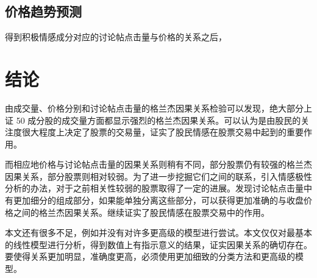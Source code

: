 \section{价格趋势预测}

得到积极情感成分对应的讨论帖点击量与价格的关系之后，

\chapter{结论}

由成交量、价格分别和讨论帖点击量的格兰杰因果关系检验可以发现，绝大部分上证 50 成分股的成交量方面都显示强烈的格兰杰因果关系。可以认为是由股民的关注度很大程度上决定了股票的交易量，证实了股民情感在股票交易中起到的重要作用。

而相应地价格与讨论帖点击量的因果关系则稍有不同，部分股票仍有较强的格兰杰因果关系，部分股票则相对较弱。为了进一步挖掘它们之间的联系，引入情感极性分析的办法，对于之前相关性较弱的股票取得了一定的进展。发现讨论帖点击量中有更加细分的组成部分，如果能单独分离这些部分，可以获得更加准确的与收盘价格之间的格兰杰因果关系。继续证实了股民情感在股票交易中的作用。

本文还有很多不足，例如并没有对许多更高级的模型进行尝试。本文仅仅对最基本的线性模型进行分析，得到数值上有指示意义的结果，证实因果关系的确切存在。要使得关系更加明显，准确度更高，必须使用更加细致的分类方法和更高级的模型。

